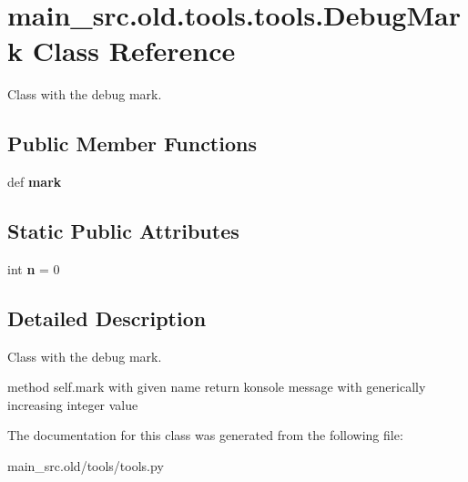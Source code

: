 \hypertarget{classmain__src_8old_1_1tools_1_1tools_1_1DebugMark}{\section{main\-\_\-src.\-old.\-tools.\-tools.\-Debug\-Mark Class Reference}
\label{classmain__src_8old_1_1tools_1_1tools_1_1DebugMark}
}


Class with the debug mark.  


\subsection*{Public Member Functions}
\begin{DoxyCompactItemize}
\item 
\hypertarget{classmain__src_8old_1_1tools_1_1tools_1_1DebugMark_aec3ec2dca67526a836c534775c3910b4}{def {\bfseries mark}}\label{classmain__src_8old_1_1tools_1_1tools_1_1DebugMark_aec3ec2dca67526a836c534775c3910b4}

\end{DoxyCompactItemize}
\subsection*{Static Public Attributes}
\begin{DoxyCompactItemize}
\item 
\hypertarget{classmain__src_8old_1_1tools_1_1tools_1_1DebugMark_a05861a5b148713341abf2a0b38d5a7d3}{int {\bfseries n} = 0}\label{classmain__src_8old_1_1tools_1_1tools_1_1DebugMark_a05861a5b148713341abf2a0b38d5a7d3}

\end{DoxyCompactItemize}


\subsection{Detailed Description}
Class with the debug mark. 

method self.\-mark with given name return konsole message with generically increasing integer value 

The documentation for this class was generated from the following file\-:\begin{DoxyCompactItemize}
\item 
main\-\_\-src.\-old/tools/tools.\-py\end{DoxyCompactItemize}
